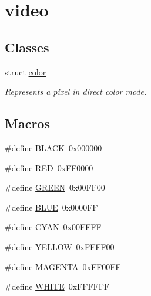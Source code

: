\hypertarget{group__video}{}\section{video}
\label{group__video}
\subsection*{Classes}
\begin{DoxyCompactItemize}
\item 
struct \mbox{\hyperlink{structcolor}{color}}
\begin{DoxyCompactList}\small\item\em Represents a pixel in direct color mode. \end{DoxyCompactList}\end{DoxyCompactItemize}
\subsection*{Macros}
\begin{DoxyCompactItemize}
\item 
\#define \mbox{\hyperlink{group__video_ga7b3b25cba33b07c303f3060fe41887f6}{B\+L\+A\+CK}}~0x000000
\item 
\#define \mbox{\hyperlink{group__video_ga8d23feea868a983c8c2b661e1e16972f}{R\+ED}}~0x\+F\+F0000
\item 
\#define \mbox{\hyperlink{group__video_gacfbc006ea433ad708fdee3e82996e721}{G\+R\+E\+EN}}~0x00\+F\+F00
\item 
\#define \mbox{\hyperlink{group__video_ga79d10e672abb49ad63eeaa8aaef57c38}{B\+L\+UE}}~0x0000\+FF
\item 
\#define \mbox{\hyperlink{group__video_gad243f93c16bc4c1d3e0a13b84421d760}{C\+Y\+AN}}~0x00\+F\+F\+FF
\item 
\#define \mbox{\hyperlink{group__video_gabf681265909adf3d3e8116c93c0ba179}{Y\+E\+L\+L\+OW}}~0x\+F\+F\+F\+F00
\item 
\#define \mbox{\hyperlink{group__video_ga6f699060902f800f12aaae150f3a708e}{M\+A\+G\+E\+N\+TA}}~0x\+F\+F00\+FF
\item 
\#define \mbox{\hyperlink{group__video_ga87b537f5fa5c109d3c05c13d6b18f382}{W\+H\+I\+TE}}~0x\+F\+F\+F\+F\+FF
\end{DoxyCompactItemize}
